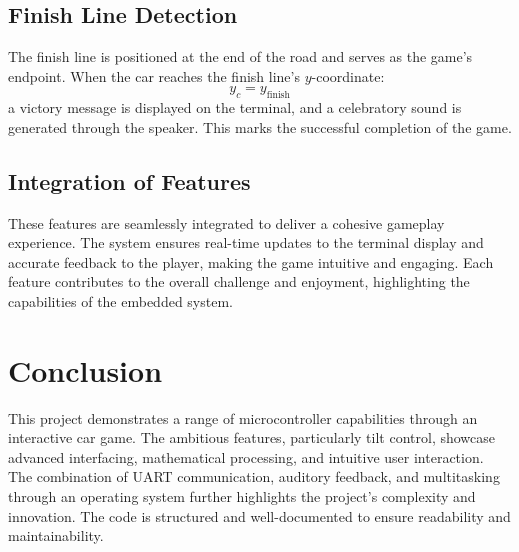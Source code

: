 \documentclass[conference]{IEEEtran}
\begin{document}
\subsection{Finish Line Detection}
The finish line is positioned at the end of the road and serves as the game's endpoint. When the car reaches the finish line's $y$-coordinate:
\begin{equation}
y_c = y_{\text{finish}}
\end{equation}
a victory message is displayed on the terminal, and a celebratory sound is generated through the speaker. This marks the successful completion of the game.

\subsection{Integration of Features}
These features are seamlessly integrated to deliver a cohesive gameplay experience. The system ensures real-time updates to the terminal display and accurate feedback to the player, making the game intuitive and engaging. Each feature contributes to the overall challenge and enjoyment, highlighting the capabilities of the embedded system.

\section{Conclusion}
This project demonstrates a range of microcontroller capabilities through an interactive car game. The ambitious features, particularly tilt control, showcase advanced interfacing, mathematical processing, and intuitive user interaction. The combination of UART communication, auditory feedback, and multitasking through an operating system further highlights the project’s complexity and innovation. The code is structured and well-documented to ensure readability and maintainability.
\end{document}
